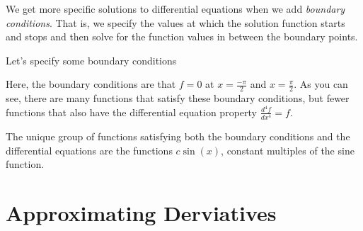 \documentclass{ximera}
\begin{document}
We get more specific solutions to differential equations when we add \emph{boundary conditions}. That is, we specify the values at which the solution function starts and stops and then solve for the function values in between the boundary points. 

Let's specify some boundary conditions 


Here, the boundary conditions are that $f=0$ at $x=\frac{-\pi}{2}$ and $x=\frac{\pi}{2}$. As you can see, there are many functions that satisfy these boundary conditions, but fewer functions that also have the differential equation property $\frac{d^4f}{dx^4} = f$.

The unique group of functions satisfying both the boundary conditions and the differential equations are the functions $c\sin(x)$, constant multiples of the sine function.

\section{Approximating Derviatives}
\end{document}
